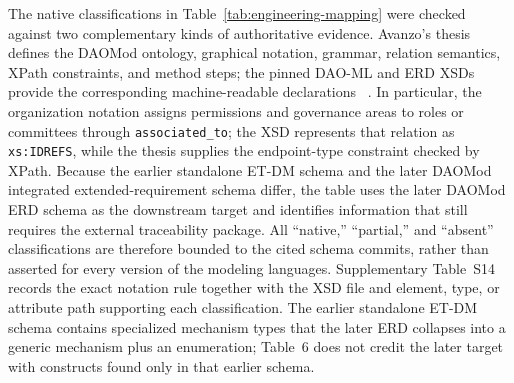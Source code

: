 \documentclass[referee,sn-basic]{sn-jnl}
\begin{document}
The native classifications in Table~\ref{tab:engineering-mapping} were checked
against two complementary kinds of authoritative evidence. Avanzo's thesis
defines the DAOMod ontology, graphical notation, grammar, relation semantics,
XPath constraints, and method steps; the pinned DAO-ML and
ERD XSDs provide the corresponding machine-readable declarations
~\cite{Avanzo2024DAOML,Avanzo2025Thesis,Avanzo2024ETDMSchema,
Avanzo2025DAOModSchemas}. In particular, the organization notation assigns
permissions and governance areas to roles or committees through
\texttt{associated\_to}; the XSD represents that relation as \texttt{xs:IDREFS},
while the thesis supplies the endpoint-type constraint checked by XPath. Because
the earlier standalone ET-DM schema and the
later DAOMod integrated extended-requirement schema differ, the table uses the
later DAOMod ERD schema as the downstream target and identifies information that
still requires the external traceability package. All ``native,'' ``partial,''
and ``absent'' classifications are therefore bounded to the cited schema
commits, rather than asserted for every version of the modeling languages.
Supplementary Table~S14 records the exact notation rule together with the XSD
file and element, type, or attribute path supporting each classification. The earlier standalone ET-DM
schema contains specialized mechanism types that the later ERD collapses into
a generic mechanism plus an enumeration; Table~6 does not credit the later
target with constructs found only in that earlier schema.
\end{document}
